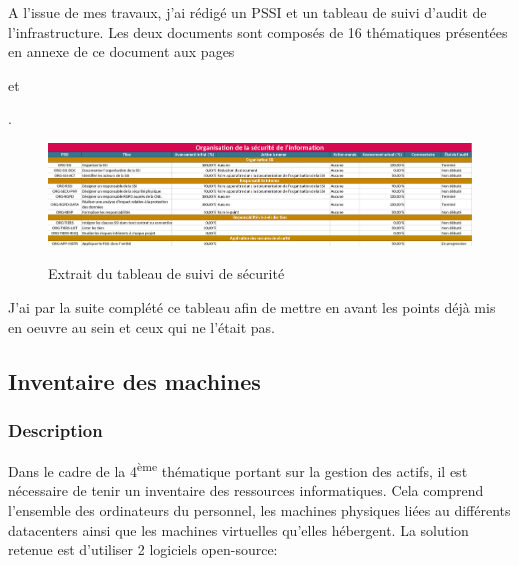 \documentclass[12pt]{article}
\begin{document}
A l'issue de mes travaux, j'ai rédigé un PSSI et un tableau de suivi d'audit de l'infrastructure. 
Les deux documents sont composés de 16 thématiques présentées en annexe de ce document aux pages \begin{hilite} \pageref{tab:16thematiques1} \end{hilite} et \begin{hilite} \pageref{tab:16thematiques2} \end{hilite}.
\begin{figure}[!ht]
    \centering
    \includegraphics[width=\textwidth]{src/table_example.png}
    \label{fig:pssi_table}
    \caption{Extrait du tableau de suivi de sécurité}
\end{figure}

J'ai par la suite complété ce tableau afin de mettre en avant les points déjà mis en oeuvre au sein et ceux qui ne l'était pas.

\newpage
\subsection{Inventaire des machines}
\subsubsection{Description}

Dans le cadre de la 4\textsuperscript{ème} thématique portant sur la gestion des actifs, il est nécessaire de tenir un inventaire des ressources informatiques. 
Cela comprend l'ensemble des ordinateurs du personnel, les machines physiques liées au différents datacenters ainsi que les machines virtuelles qu'elles hébergent.
La solution retenue est d'utiliser 2 logiciels open-source:
\end{document}
